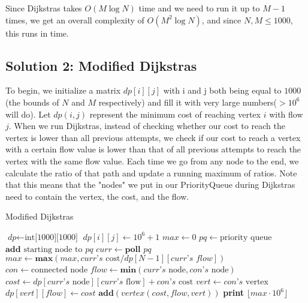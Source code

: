 \documentclass{article}
\begin{document}
    \hspace*{1em} \quad Since Dijkstras takes $O(M \log N)$ time and we need to run it up to $M-1$ times, we get an overall complexity of $O(M^2 \log N)$, and since $N, M \leq 1000$, this runs in time.

\subsection{Solution 2: Modified Dijkstras}
    \hspace*{1em} \quad To begin, we initialize a matrix $dp[i][j]$ with i and j both being equal to $1000$ (the bounds of $N$ and $M$ respectively) and fill it with very large numbers($>10^6$ will do). Let $dp(i, j)$ represent the minimum cost of reaching vertex $i$ with flow $j$. When we run Dijkstras, instead of checking whether our cost to reach the vertex is lower than all previous attempts, we check if our cost to reach a vertex with a certain flow value is lower than that of all previous attempts to reach the vertex with the same flow value. Each time we go from any node to the end, we calculate the ratio of that path and update a running maximum of ratios. Note that this means that the "nodes" we put in our PriorityQueue during Dijkstras need to contain the vertex, the cost, and the flow. \newline
    
    \begin{algorithm}
        \caption{Modified Dijkstras}
        \begin{algorithmic}[1]
        \State $\textit{dp} \gets \text{int[1000][1000]}$
            \State $\textit{dp}[i][j] \gets 10^6+1$
            \EndFor
        \State $max \gets 0$
        \State $pq \gets \text{priority queue}$
        \State $\textbf{add } \text{starting node to } pq$
            \State $curr \gets \textbf{poll } pq$
                \State $max \gets \textbf{max}(max, \textit{curr's } \text{cost}/dp[N-1][\textit{curr's flow}])$
            \EndIf
                \State $con \gets \text{connected node}$
                \State $flow \gets \textbf{min}(\textit{curr's }\text{node}, \textit{con's }\text{node})$
                \State $cost \gets dp[\textit{curr's }\text{node}][ \textit{curr's }\text{flow}] + \textit{con's }\text{cost}$
                \State $vert \gets \textit{con's }\text{vertex}$
                    \State $dp[vert][flow] \gets cost$
                    \State $\textbf{add}(\textit{vertex}(cost, flow, vert))$
                    \EndIf
                \EndFor
        \EndWhile
        \State \textbf{print} \textit{$\lfloor max \cdot 10^6 \rfloor$}
        \end{algorithmic}
    \end{algorithm}
    
\end{document}
